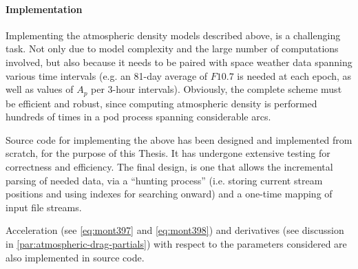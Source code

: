 \paragraph{Implementation}\label{par:atmospheric-drag-implementation}

Implementing the atmospheric density models described above, is a challenging task. Not only due to
model complexity and the large number of computations involved, but also because 
it needs to be paired with space weather data spanning various time intervals 
(e.g. an 81-day average of $F10.7$ is needed at each epoch, as well as values of $A_p$ per 3-hour intervals). 
Obviously, the complete scheme must be efficient and robust, since computing atmospheric 
density is performed hundreds of times in a \gls{pod} process spanning considerable 
arcs.

Source code for implementing the above has been designed and implemented from 
scratch, for the purpose of this Thesis. It has undergone extensive testing for 
correctness and efficiency. The final design, is one that allows the incremental 
parsing of needed data, via a ``hunting process'' (i.e. storing current stream 
positions and using indexes for searching onward) and a one-time mapping of 
input file streams.

Acceleration (see \autoref{eq:mont397} and \autoref{eq:mont398}) and derivatives 
(see discussion in \autoref{par:atmospheric-drag-partials}) with respect to the 
parameters considered are also implemented in source code.

